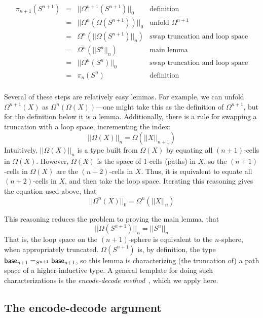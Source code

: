 \[
\begin{array}{rcll}
\pi_{n+1}(S^{n+1}) & = & ||\Omega^{n+1}(S^{n+1})||_0 & \text{definition}\\
                  & = & ||\Omega^{n}(\Omega(S^{n+1}))||_0 & \text{unfold $\Omega^{n+1}$} \\
                  & = & \Omega^{n}(||\Omega(S^{n+1})||_n) & \text{swap truncation and loop space} \\
                  & = & \Omega^{n}(||S^{n}||_n) & \text{main lemma} \\
                  & = & ||\Omega^{n}(S^{n})||_0 & \text{swap truncation and loop space} \\
                  & = & \pi_n(S^n) & \text{definition} \\
\end{array}
\]

Several of these steps are relatively easy lemmas.  For example, we can
unfold $\Omega^{n+1}(X)$ as $\Omega^n(\Omega(X))$---one might
take this as the definition of $\Omega^{n+1}$, but for the definition
below it is a lemma.  Additionally, there is a rule for swapping
a truncation with a loop space, incrementing the index:
\[
||\Omega(X)||_n = \Omega(||X||_{n+1})
\]
Intuitively, $||\Omega(X)||_n$ is a type built from $\Omega(X)$ by
equating all $(n+1)$-cells in $\Omega(X)$.  However, $\Omega(X)$ is the
space of 1-cells (paths) in $X$, so the $(n+1)$-cells in $\Omega(X)$ are the
$(n+2)$-cells in $X$.  Thus, it is equivalent to equate all $(n+2)$-cells in
$X$, and then take the loop space.  Iterating this reasoning gives the
equation used above, that
\[
||\Omega^n(X)||_0 = \Omega^n(||X||_{n})
\]

This reasoning reduces the problem to proving the main lemma, that 
\[
||\Omega(S^{n+1})||_n = ||S^{n}||_n
\]
That is, the loop space on the $(n+1)$-sphere is equivalent to the
$n$-sphere, when appropriately truncated.  $\Omega(S^{n+1})$ is, by
definition, the type $\mathsf{base}_{n+1} =_{S^{n+1}} \mathsf{base}_{n+1}$, 
so this lemma is characterizing (the truncation of) a path space of a
higher-inductive type.  A general template for doing such
characterizations is the 
\emph{encode-decode method}~\citep[Section 8.9]{uf13hott-book}, which we
apply here.  

\subsection{The encode-decode argument}

